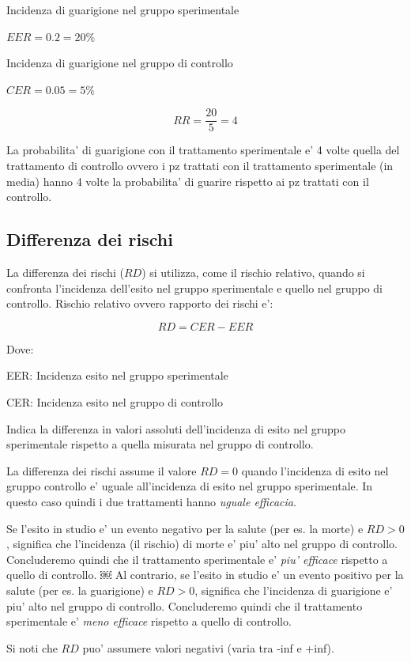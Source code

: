 \documentclass[]{book}
\begin{document}
Incidenza di guarigione nel gruppo sperimentale

\(EER = 0.2 = 20\%\)

Incidenza di guarigione nel gruppo di controllo

\(CER= 0.05 = 5\%\)

\[RR = \frac {20}{5} = 4\]

La probabilita' di guarigione con il trattamento sperimentale e' 4 volte quella del trattamento di controllo
ovvero i pz trattati con il trattamento sperimentale (in media) hanno 4 volte la probabilita' di guarire rispetto ai pz trattati con il controllo.

\hypertarget{differenza-dei-rischi}{%
\subsection{Differenza dei rischi}\label{differenza-dei-rischi}}

La differenza dei rischi (\(RD\)) si utilizza, come il rischio relativo, quando si confronta l'incidenza dell'esito nel gruppo sperimentale e quello nel gruppo di controllo.
Rischio relativo ovvero rapporto dei rischi e':

\[ RD = { CER -EER}\]

Dove:

EER: Incidenza esito nel gruppo sperimentale

CER: Incidenza esito nel gruppo di controllo

Indica la differenza in valori assoluti dell'incidenza di esito nel gruppo sperimentale rispetto a quella misurata nel gruppo di controllo.

La differenza dei rischi assume il valore \(RD=0\) quando l'incidenza di esito nel gruppo controllo e' uguale all'incidenza di esito nel gruppo sperimentale. In questo caso quindi i due trattamenti hanno \emph{uguale efficacia}.

Se l'esito in studio e' un evento negativo per la salute (per es. la morte) e \(RD>0\), significa che l'incidenza (il rischio) di morte e' piu' alto nel gruppo di controllo. Concluderemo quindi che il trattamento sperimentale e' \emph{piu' efficace} rispetto a quello di controllo.
￼
Al contrario, se l'esito in studio e' un evento positivo per la salute (per es. la guarigione) e \(RD>0\), significa che l'incidenza di guarigione e' piu' alto nel gruppo di controllo. Concluderemo quindi che il trattamento sperimentale e' \emph{meno efficace} rispetto a quello di controllo.

Si noti che \(RD\) puo' assumere valori negativi (varia tra -inf e +inf).
\end{document}
